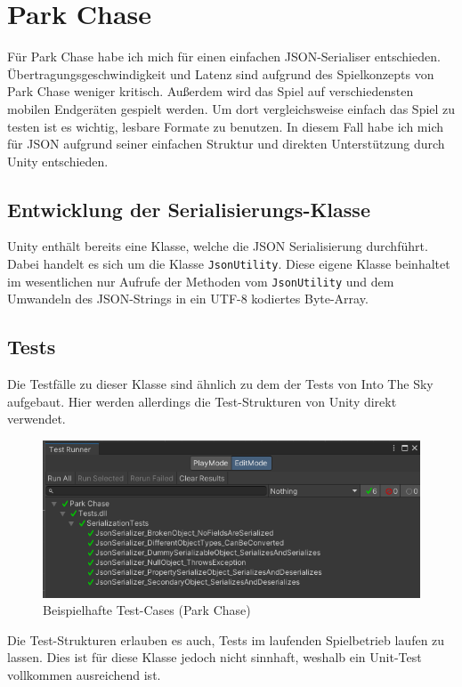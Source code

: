 \section{Park Chase}

Für Park Chase habe ich mich für einen einfachen JSON-Serialiser entschieden. Übertragungsgeschwindigkeit und Latenz sind aufgrund des Spielkonzepts von Park Chase weniger kritisch. Außerdem wird das Spiel auf verschiedensten mobilen Endgeräten gespielt werden. Um dort vergleichsweise einfach das Spiel zu testen ist es wichtig, lesbare Formate zu benutzen. In diesem Fall habe ich mich für JSON aufgrund seiner einfachen Struktur und direkten Unterstützung durch Unity entschieden.

\subsection{Entwicklung der Serialisierungs-Klasse}

Unity enthält bereits eine Klasse, welche die JSON Serialisierung durchführt. Dabei handelt es sich um die Klasse \verb|JsonUtility|. Diese eigene Klasse beinhaltet im wesentlichen nur Aufrufe der Methoden vom  \verb|JsonUtility| und dem Umwandeln des JSON-Strings in ein UTF-8 kodiertes Byte-Array.

\subsection{Tests}

Die Testfälle zu dieser Klasse sind ähnlich zu dem der Tests von Into The Sky aufgebaut. Hier werden allerdings die Test-Strukturen von Unity direkt verwendet. 

\begin{figure}[!h]
	\centering
	\includegraphics[width=16cm]{figures/parkchasetests.png}
	\caption{Beispielhafte Test-Cases (Park Chase)}
	\label{fig:parkchasetests}
\end{figure}

Die Test-Strukturen erlauben es auch, Tests im laufenden Spielbetrieb laufen zu lassen. Dies ist für diese Klasse jedoch nicht sinnhaft, weshalb ein Unit-Test vollkommen ausreichend ist.

\newpage

